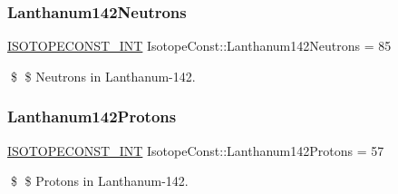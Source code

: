 \subsubsection{\texorpdfstring{Lanthanum142\+Neutrons}{Lanthanum142Neutrons}}
{\footnotesize\ttfamily \mbox{\hyperlink{group___isotope_const-_macros_ga5f18360b3e99483a35c32d789e62621c}{I\+S\+O\+T\+O\+P\+E\+C\+O\+N\+S\+T\+\_\+\+I\+NT}} Isotope\+Const\+::\+Lanthanum142\+Neutrons = 85}

\$ \$ Neutrons in Lanthanum-\/142. \mbox{\label{group___isotope_const-_lanthanum-_la142_ga387db8c2b97948b54e30652f736f6431}} 
\subsubsection{\texorpdfstring{Lanthanum142\+Protons}{Lanthanum142Protons}}
{\footnotesize\ttfamily \mbox{\hyperlink{group___isotope_const-_macros_ga5f18360b3e99483a35c32d789e62621c}{I\+S\+O\+T\+O\+P\+E\+C\+O\+N\+S\+T\+\_\+\+I\+NT}} Isotope\+Const\+::\+Lanthanum142\+Protons = 57}

\$ \$ Protons in Lanthanum-\/142. 